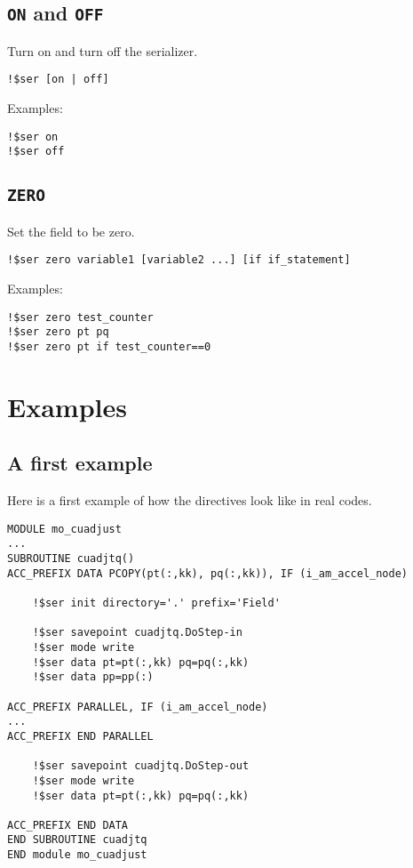 \documentclass{article}
\begin{document}
\subsection{\texttt{ON} and \texttt{OFF}}
Turn on and turn off the serializer.
\begin{lstlisting}
!$ser [on | off]
\end{lstlisting}

Examples:
\begin{lstlisting}
!$ser on
!$ser off
\end{lstlisting}

\subsection{\texttt{ZERO}}
Set the field to be zero.
\begin{lstlisting}
!$ser zero variable1 [variable2 ...] [if if_statement]
\end{lstlisting}

Examples:
\begin{lstlisting}
!$ser zero test_counter
!$ser zero pt pq
!$ser zero pt if test_counter==0
\end{lstlisting}

\section{Examples}
\label{sec:examples}

\subsection{A first example}
\label{ex:first}
Here is a first example of how the directives look like in real codes.
\begin{lstlisting}
MODULE mo_cuadjust
...
SUBROUTINE cuadjtq()
ACC_PREFIX DATA PCOPY(pt(:,kk), pq(:,kk)), IF (i_am_accel_node)

    !$ser init directory='.' prefix='Field'

    !$ser savepoint cuadjtq.DoStep-in
    !$ser mode write
    !$ser data pt=pt(:,kk) pq=pq(:,kk)
    !$ser data pp=pp(:)

ACC_PREFIX PARALLEL, IF (i_am_accel_node)
...
ACC_PREFIX END PARALLEL

    !$ser savepoint cuadjtq.DoStep-out
    !$ser mode write
    !$ser data pt=pt(:,kk) pq=pq(:,kk)

ACC_PREFIX END DATA
END SUBROUTINE cuadjtq
END module mo_cuadjust
\end{lstlisting}
\end{document}
